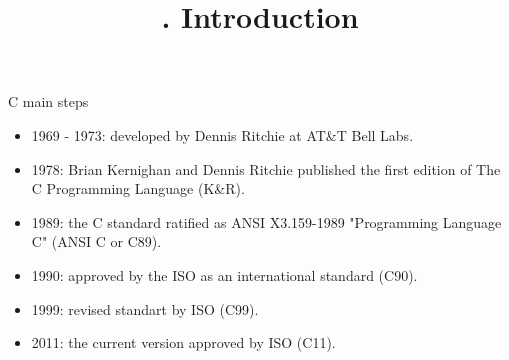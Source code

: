 

\title{. Introduction}




\frame{\titlepage}
\begin{frame}{C main steps}
    \begin{itemize}
        \item 1969 - 1973: developed by Dennis Ritchie at AT\&T Bell Labs.
        \pause\item 1978: Brian Kernighan and Dennis Ritchie published the first edition of The C Programming Language (K\&R).
        \pause\item 1989: the C standard ratified as ANSI X3.159-1989 "Programming Language C" (ANSI C or C89).
        \pause\item 1990: approved by the ISO as an international standard (C90).
        \pause\item 1999: revised standart by ISO (C99).
        \pause\item 2011: the current version approved by ISO (C11).
    \end{itemize}
\end{frame}
